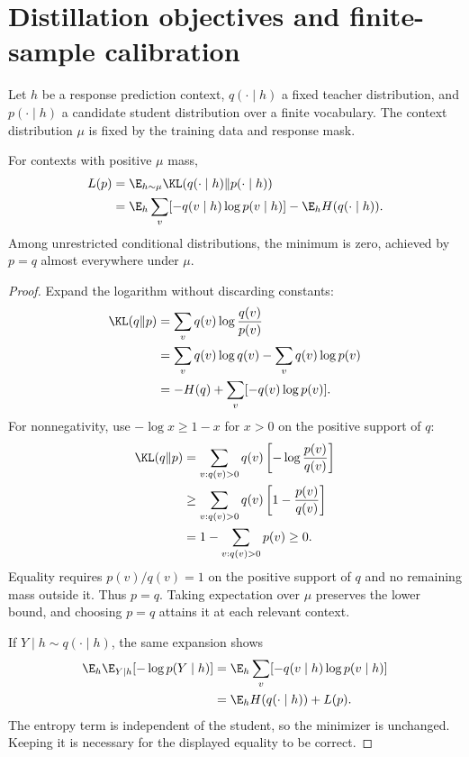 \section{Distillation objectives and finite-sample calibration}
\label{app:distill_proofs}
Let $h$ be a response prediction context, $q(\cdot\mid h)$ a fixed teacher distribution, and $p(\cdot\mid h)$ a candidate student distribution over a finite vocabulary. The context distribution $\mu$ is fixed by the training data and response mask.

\begin{proposition}
For contexts with positive $\mu$ mass,
\begin{align}
L(p)&=\E_{h\sim\mu}\KL(q(\cdot\mid h)\Vert p(\cdot\mid h))\\
&=\E_h\sum_v[-q(v\mid h)\log p(v\mid h)]-\E_hH(q(\cdot\mid h)).
\end{align}
Among unrestricted conditional distributions, the minimum is zero, achieved by $p=q$ almost everywhere under $\mu$.
\end{proposition}
\begin{proof}
Expand the logarithm without discarding constants:
\begin{align}
\KL(q\Vert p)
&=\sum_vq(v)\log\frac{q(v)}{p(v)}\\
&=\sum_vq(v)\log q(v)-\sum_vq(v)\log p(v)\\
&=-H(q)+\sum_v[-q(v)\log p(v)].
\end{align}
For nonnegativity, use $-\log x\geq1-x$ for $x>0$ on the positive support of $q$:
\begin{align}
\KL(q\Vert p)
&=\sum_{v:q(v)>0}q(v)\left[-\log\frac{p(v)}{q(v)}\right]\\
&\geq\sum_{v:q(v)>0}q(v)\left[1-\frac{p(v)}{q(v)}\right]\\
&=1-\sum_{v:q(v)>0}p(v)\geq0.
\end{align}
Equality requires $p(v)/q(v)=1$ on the positive support of $q$ and no remaining mass outside it. Thus $p=q$. Taking expectation over $\mu$ preserves the lower bound, and choosing $p=q$ attains it at each relevant context.

If $Y\mid h\sim q(\cdot\mid h)$, the same expansion shows
\begin{align}
\E_h\E_{Y\mid h}[-\log p(Y\mid h)]
&=\E_h\sum_v[-q(v\mid h)\log p(v\mid h)]\\
&=\E_hH(q(\cdot\mid h))+L(p).
\end{align}
The entropy term is independent of the student, so the minimizer is unchanged. Keeping it is necessary for the displayed equality to be correct.
\end{proof}

